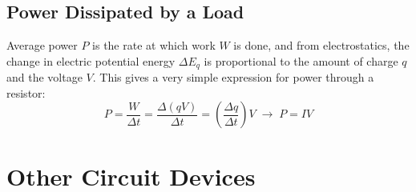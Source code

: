 \subsection{Power Dissipated by a Load}
Average power $P$ is the rate at which work $W$ is done, and from
electrostatics, the change in electric potential energy $\Delta E_q$ is
proportional to the amount of charge $q$ and the voltage $V$. This gives a
very simple expression for power through a resistor:
\begin{equation}
  P=\frac W{\Delta t}=\frac{\Delta (qV)}{\Delta t}
  =\left(\frac{\Delta q}{\Delta t}\right)V
  \;\rightarrow\;\boxed{P=IV}
\end{equation}
%
%
%
%
%
%
%
%
\section{Other Circuit Devices}

